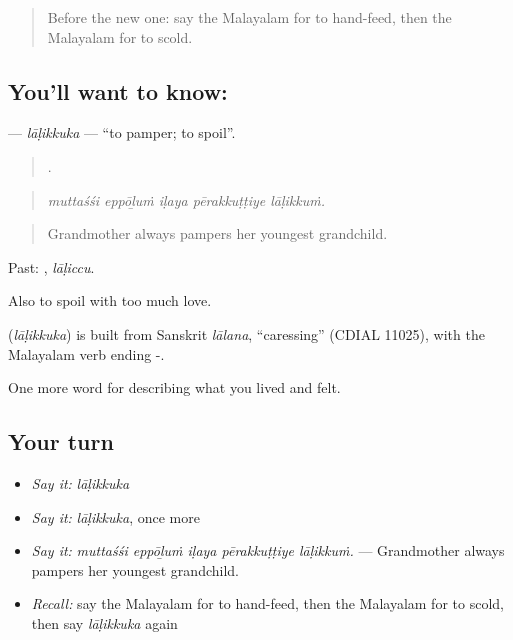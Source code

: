 \label{lesson:ML-C557-lalikkuka}



\begin{quote}
Before the new one: say the Malayalam for to hand-feed, then the Malayalam for to scold.
\end{quote}

\subsection*{You'll want to know: }
\textbf{} — \emph{lāḷikkuka} — \textquotedblleft{}to pamper; to spoil\textquotedblright{}.

\begin{quote}
    .
\end{quote}

\begin{quote}
\emph{muttaśśi eppōḻuṁ iḷaya pērakkuṭṭiye lāḷikkuṁ.}
\end{quote}

\begin{quote}
Grandmother always pampers her youngest grandchild.
\end{quote}

Past: , \emph{lāḷiccu}.

Also to spoil with too much love.

\begin{cousinweb}
\textbf{} (\emph{lāḷikkuka}) is built from Sanskrit \emph{lālana}, \textquotedblleft{}caressing\textquotedblright{} (CDIAL 11025), with the Malayalam verb ending -.
\end{cousinweb}

\begin{grammarlens}[title={What you've built}]
One more word for describing what you lived and felt.
\end{grammarlens}

\subsection*{Your turn}
\begin{itemize}
\raggedright
  \item \emph{Say it:} \emph{lāḷikkuka}
  \item \emph{Say it:} \emph{lāḷikkuka}, once more
  \item \emph{Say it:} \emph{muttaśśi eppōḻuṁ iḷaya pērakkuṭṭiye lāḷikkuṁ.} — Grandmother always pampers her youngest grandchild.
  \item \emph{Recall:} say the Malayalam for to hand-feed, then the Malayalam for to scold, then say \emph{lāḷikkuka} again
\end{itemize}

